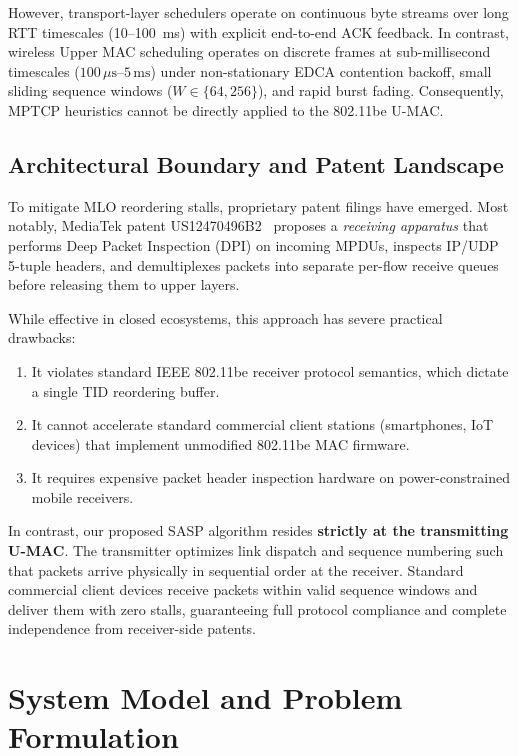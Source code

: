 \documentclass[10pt,journal,compsoc]{IEEEtran}
\begin{document}
However, transport-layer schedulers operate on continuous byte streams over long RTT timescales (10--100~ms) with explicit end-to-end ACK feedback. In contrast, wireless Upper MAC scheduling operates on discrete frames at sub-millisecond timescales ($100\,\mu\text{s}$--$5\,\text{ms}$) under non-stationary EDCA contention backoff, small sliding sequence windows ($W \in \{64, 256\}$), and rapid burst fading. Consequently, MPTCP heuristics cannot be directly applied to the 802.11be U-MAC.

\subsection{Architectural Boundary and Patent Landscape}
To mitigate MLO reordering stalls, proprietary patent filings have emerged. Most notably, MediaTek patent US12470496B2~\cite{mediatek2024reordering} proposes a \emph{receiving apparatus} that performs Deep Packet Inspection (DPI) on incoming MPDUs, inspects IP/UDP 5-tuple headers, and demultiplexes packets into separate per-flow receive queues before releasing them to upper layers.

While effective in closed ecosystems, this approach has severe practical drawbacks:
\begin{enumerate}
    \item It violates standard IEEE 802.11be receiver protocol semantics, which dictate a single TID reordering buffer.
    \item It cannot accelerate standard commercial client stations (smartphones, IoT devices) that implement unmodified 802.11be MAC firmware.
    \item It requires expensive packet header inspection hardware on power-constrained mobile receivers.
\end{enumerate}
In contrast, our proposed SASP algorithm resides \textbf{strictly at the transmitting U-MAC}. The transmitter optimizes link dispatch and sequence numbering such that packets arrive physically in sequential order at the receiver. Standard commercial client devices receive packets within valid sequence windows and deliver them with zero stalls, guaranteeing full protocol compliance and complete independence from receiver-side patents.

\section{System Model and Problem Formulation}
\label{sec:system_model}
\end{document}
